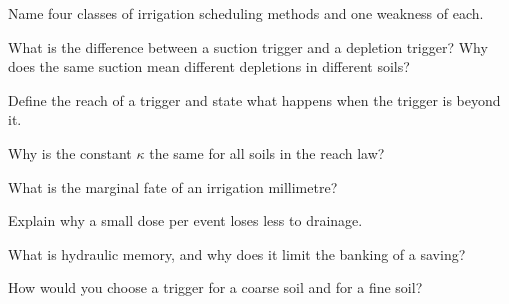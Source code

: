 \begin{exlist}
\item Name four classes of irrigation scheduling methods and one weakness of each.
\item What is the difference between a suction trigger and a depletion trigger? Why does the same suction mean different depletions in different soils?
\item Define the reach of a trigger and state what happens when the trigger is beyond it.
\item Why is the constant $\kappa$ the same for all soils in the reach law?
\item What is the marginal fate of an irrigation millimetre?
\item Explain why a small dose per event loses less to drainage.
\item What is hydraulic memory, and why does it limit the banking of a saving?
\item How would you choose a trigger for a coarse soil and for a fine soil?
\end{exlist}
